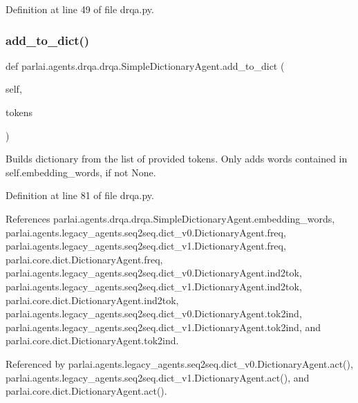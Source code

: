 Definition at line 49 of file drqa.\+py.

\mbox{\label{classparlai_1_1agents_1_1drqa_1_1drqa_1_1SimpleDictionaryAgent_a5ccaf2bd28a50af2062ad2efd6a36e0e}} 
\subsubsection{\texorpdfstring{add\+\_\+to\+\_\+dict()}{add\_to\_dict()}}
{\footnotesize\ttfamily def parlai.\+agents.\+drqa.\+drqa.\+Simple\+Dictionary\+Agent.\+add\+\_\+to\+\_\+dict (\begin{DoxyParamCaption}\item[{}]{self,  }\item[{}]{tokens }\end{DoxyParamCaption})}

\begin{DoxyVerb}Builds dictionary from the list of provided tokens.
Only adds words contained in self.embedding_words, if not None.
\end{DoxyVerb}
 

Definition at line 81 of file drqa.\+py.



References parlai.\+agents.\+drqa.\+drqa.\+Simple\+Dictionary\+Agent.\+embedding\+\_\+words, parlai.\+agents.\+legacy\+\_\+agents.\+seq2seq.\+dict\+\_\+v0.\+Dictionary\+Agent.\+freq, parlai.\+agents.\+legacy\+\_\+agents.\+seq2seq.\+dict\+\_\+v1.\+Dictionary\+Agent.\+freq, parlai.\+core.\+dict.\+Dictionary\+Agent.\+freq, parlai.\+agents.\+legacy\+\_\+agents.\+seq2seq.\+dict\+\_\+v0.\+Dictionary\+Agent.\+ind2tok, parlai.\+agents.\+legacy\+\_\+agents.\+seq2seq.\+dict\+\_\+v1.\+Dictionary\+Agent.\+ind2tok, parlai.\+core.\+dict.\+Dictionary\+Agent.\+ind2tok, parlai.\+agents.\+legacy\+\_\+agents.\+seq2seq.\+dict\+\_\+v0.\+Dictionary\+Agent.\+tok2ind, parlai.\+agents.\+legacy\+\_\+agents.\+seq2seq.\+dict\+\_\+v1.\+Dictionary\+Agent.\+tok2ind, and parlai.\+core.\+dict.\+Dictionary\+Agent.\+tok2ind.



Referenced by parlai.\+agents.\+legacy\+\_\+agents.\+seq2seq.\+dict\+\_\+v0.\+Dictionary\+Agent.\+act(), parlai.\+agents.\+legacy\+\_\+agents.\+seq2seq.\+dict\+\_\+v1.\+Dictionary\+Agent.\+act(), and parlai.\+core.\+dict.\+Dictionary\+Agent.\+act().

